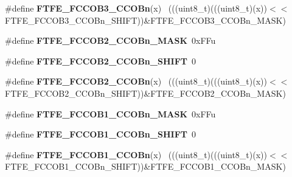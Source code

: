 \begin{DoxyCompactItemize}
\item 
\hypertarget{group___f_t_f_e___register___masks_ga9ff5edd0c9be2c8fa0b153e41f3b0ac4}{}\#define {\bfseries F\+T\+F\+E\+\_\+\+F\+C\+C\+O\+B3\+\_\+\+C\+C\+O\+Bn}(x)                                      ~(((uint8\+\_\+t)(((uint8\+\_\+t)(x))$<$$<$F\+T\+F\+E\+\_\+\+F\+C\+C\+O\+B3\+\_\+\+C\+C\+O\+Bn\+\_\+\+S\+H\+I\+F\+T))\&F\+T\+F\+E\+\_\+\+F\+C\+C\+O\+B3\+\_\+\+C\+C\+O\+Bn\+\_\+\+M\+A\+S\+K)\label{group___f_t_f_e___register___masks_ga9ff5edd0c9be2c8fa0b153e41f3b0ac4}

\item 
\hypertarget{group___f_t_f_e___register___masks_ga87254fe5b3a8f4a9c0251e3fac167128}{}\#define {\bfseries F\+T\+F\+E\+\_\+\+F\+C\+C\+O\+B2\+\_\+\+C\+C\+O\+Bn\+\_\+\+M\+A\+S\+K}~0x\+F\+Fu\label{group___f_t_f_e___register___masks_ga87254fe5b3a8f4a9c0251e3fac167128}

\item 
\hypertarget{group___f_t_f_e___register___masks_ga773bf70a49a9212d4fcbf025e64955d8}{}\#define {\bfseries F\+T\+F\+E\+\_\+\+F\+C\+C\+O\+B2\+\_\+\+C\+C\+O\+Bn\+\_\+\+S\+H\+I\+F\+T}~0\label{group___f_t_f_e___register___masks_ga773bf70a49a9212d4fcbf025e64955d8}

\item 
\hypertarget{group___f_t_f_e___register___masks_gac54f2de25861379f32e9e51d7e91e05d}{}\#define {\bfseries F\+T\+F\+E\+\_\+\+F\+C\+C\+O\+B2\+\_\+\+C\+C\+O\+Bn}(x)                                      ~(((uint8\+\_\+t)(((uint8\+\_\+t)(x))$<$$<$F\+T\+F\+E\+\_\+\+F\+C\+C\+O\+B2\+\_\+\+C\+C\+O\+Bn\+\_\+\+S\+H\+I\+F\+T))\&F\+T\+F\+E\+\_\+\+F\+C\+C\+O\+B2\+\_\+\+C\+C\+O\+Bn\+\_\+\+M\+A\+S\+K)\label{group___f_t_f_e___register___masks_gac54f2de25861379f32e9e51d7e91e05d}

\item 
\hypertarget{group___f_t_f_e___register___masks_gaa7e9e9a1c18414790702792750daec89}{}\#define {\bfseries F\+T\+F\+E\+\_\+\+F\+C\+C\+O\+B1\+\_\+\+C\+C\+O\+Bn\+\_\+\+M\+A\+S\+K}~0x\+F\+Fu\label{group___f_t_f_e___register___masks_gaa7e9e9a1c18414790702792750daec89}

\item 
\hypertarget{group___f_t_f_e___register___masks_gaf6829788ff3fed81b298ec16ac8346b2}{}\#define {\bfseries F\+T\+F\+E\+\_\+\+F\+C\+C\+O\+B1\+\_\+\+C\+C\+O\+Bn\+\_\+\+S\+H\+I\+F\+T}~0\label{group___f_t_f_e___register___masks_gaf6829788ff3fed81b298ec16ac8346b2}

\item 
\hypertarget{group___f_t_f_e___register___masks_gaecffe38f2cbdfa1de3c285298b91b588}{}\#define {\bfseries F\+T\+F\+E\+\_\+\+F\+C\+C\+O\+B1\+\_\+\+C\+C\+O\+Bn}(x)                                      ~(((uint8\+\_\+t)(((uint8\+\_\+t)(x))$<$$<$F\+T\+F\+E\+\_\+\+F\+C\+C\+O\+B1\+\_\+\+C\+C\+O\+Bn\+\_\+\+S\+H\+I\+F\+T))\&F\+T\+F\+E\+\_\+\+F\+C\+C\+O\+B1\+\_\+\+C\+C\+O\+Bn\+\_\+\+M\+A\+S\+K)\label{group___f_t_f_e___register___masks_gaecffe38f2cbdfa1de3c285298b91b588}


\end{DoxyCompactItemize}
